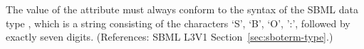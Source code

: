 The value of the attribute  must always conform to the
syntax of the SBML data type , which is a string consisting
of the characters `S', `B', `O', ':', followed by exactly seven digits.
(References: SBML L3V1 Section~\ref{sec:sboterm-type}.)
